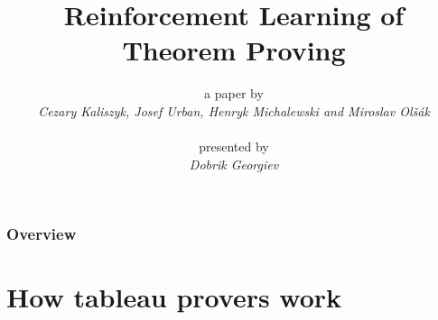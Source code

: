 \documentclass{beamer}
\title[RL of Theorem Proving]{Reinforcement Learning of Theorem Proving} %
\date{} %
\author{{\footnotesize a paper by}\\\textit{Cezary Kaliszyk, Josef Urban,
Henryk Michalewski and Miroslav Ol\v{s}{\'{a}}k}\\~\\{\footnotesize
presented by}\\\textit{Dobrik Georgiev}}
\begin{document}
\begin{frame}
\titlepage %
\end{frame}

\begin{frame}
\frametitle{Overview} %
\tableofcontents %
\end{frame}
\section{How tableau provers work} 
\end{document}
